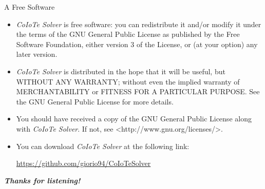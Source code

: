 \documentclass[]{beamer}
\begin{document}
\begin{frame}{\fontUbuntu A Free Software}
	\begin{small}
	\begin{itemize}
		\item \textit{CoIoTe Solver} is free software: you can redistribute it and/or modify
    it under the terms of the GNU General Public License as published by
    the Free Software Foundation, either version 3 of the License, or
    (at your option) any later version.
    		\item \textit{CoIoTe Solver} is distributed in the hope that it will be useful, but WITHOUT ANY WARRANTY; without even the implied warranty of
    MERCHANTABILITY or FITNESS FOR A PARTICULAR PURPOSE.  See the
    GNU General Public License for more details.
   		\item You should have received a copy of the GNU General Public License
    along with \textit{CoIoTe Solver}.  If not, see <http://www.gnu.org/licenses/>.
    		\item You can download \textit{CoIoTe Solver} at the following link:
    		 	
    		 	\begin{center}
    		 		{\color[HTML]{26BF18} \url{https://github.com/giorio94/CoIoTeSolver}}    		 		
    		 	\end{center}   			 
	\end{itemize}
	\end{small}
\end{frame}

\begin{frame}
	\begin{center}
		{\huge \textbf{\textit{Thanks for listening!}}}
	\end{center}
\end{frame}
\end{document}

